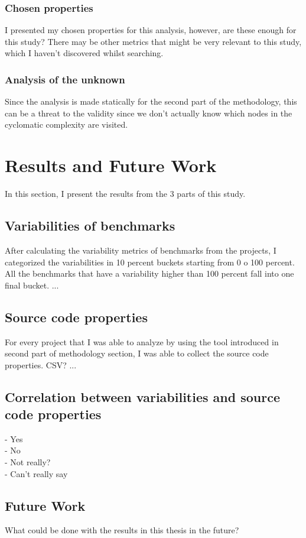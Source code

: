 \documentclass{seal_thesis}
\begin{document}
\subsection{Chosen properties}
I presented my chosen properties for this analysis, however, are these enough for this study? There may be other metrics that might be very relevant to this study, which I haven't discovered whilst searching.

\subsection{Analysis of the unknown}
Since the analysis is made statically for the second part of the methodology, this can be a threat to the validity since we don't actually know which nodes in the cyclomatic complexity are visited.


\chapter{Results and Future Work}
In this section, I present the results from the 3 parts of this study. 
\section{Variabilities of benchmarks}
After calculating the variability metrics of benchmarks from the projects, I categorized the variabilities in 10 percent buckets starting from 0 o 100 percent. All the benchmarks that have a variability higher than 100 percent fall into one final bucket. ...

\section{Source code properties}
For every project that I was able to analyze by using the tool introduced in second part of methodology section, I was able to collect the source code properties. CSV? ...

\section{Correlation between variabilities and source code properties}
- Yes \\
- No \\
- Not really? \\
- Can't really say \\

\section{Future Work}
What could be done with the results in this thesis in the future?
\end{document}
